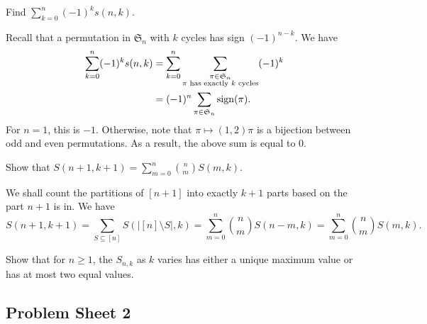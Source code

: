 		\begin{problem}
			Find $\sum_{k=0}^n (-1)^k s(n,k)$.
		\end{problem}
		\begin{solution*}
			Recall that a permutation in $\mathfrak{S}_n$ with $k$ cycles has sign $(-1)^{n-k}$. We have
			\begin{align*}
				\sum_{k=0}^n (-1)^k s(n,k) &= \sum_{k=0}^n \sum_{\substack{\pi \in \mathfrak{S}_n \\ \text{$\pi$ has exactly $k$ cycles}}} (-1)^k \\
					&= (-1)^n \sum_{\pi \in \mathfrak{S}_n} \operatorname{sign}(\pi).
			\end{align*}
			For $n=1$, this is $-1$. Otherwise, note that $\pi \mapsto (1,2) \pi$ is a bijection between odd and even permutations. As a result, the above sum is equal to $0$.
		\end{solution*}

		\begin{problem}
			Show that $S(n+1,k+1) = \sum_{m=0}^n \binom{n}{m} S(m,k)$.
		\end{problem}
		\begin{solution*}
			We shall count the partitions of $[n+1]$ into exactly $k+1$ parts based on the part $n+1$ is in. We have
			\[ S(n+1,k+1) = \sum_{S \subseteq [n]} S(|[n]\setminus S|,k) = \sum_{m=0}^n \binom{n}{m} S(n-m,k) = \sum_{m=0}^n \binom{n}{m} S(m,k). \]
		\end{solution*}


		\begin{problem}
			Show that for $n \ge 1$, the $S_{n,k}$ as $k$ varies has either a unique maximum value or has at most two equal values.
		\end{problem}
		\begin{solution*}
			
		\end{solution*}

	\subsection{Problem Sheet 2}

